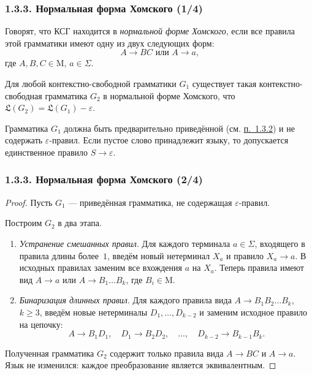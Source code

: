 \documentclass[mathserif,12pt,aspectratio=169]{beamer}
\renewcommand{\index}[1]{}
\def\odmkey#1#2{{\it\color{red} #1}\index{#2}}
\let\ge\geqslant
\def\DMref#1#2{{\color{blue}\underline{\hyperlink{#2}{#1}}}}
\begin{document}
\begin{frame}
  \frametitle{1.3.3. Нормальная форма Хомского (1/4)}

  Говорят, что КСГ находится в
  \odmkey{нормальной форме Хомского}{Нормальная форма!Хомского},
  если все правила этой грамматики имеют одну из двух следующих форм:
  \[
  A \to BC \text{ или } A \to a \text{,}
  \]
  где $A, B, C \in \mathrm{M}$, $a \in \Sigma$.

  \begin{theorem}
    Для любой контекстно-свободной грамматики $G_1$ существует такая
    контекст\-но-свободная грамматика $G_2$ в нормальной форме Хомского,
    что $\mathfrak{L}(G_2)=\mathfrak{L}(G_1)-\varepsilon$.
  \end{theorem}

  \medskip
  Грамматика $G_1$ должна быть предварительно
  приведённой (см. \DMref{п.~1.3.2}{1.3.2.}) и не содержать $\varepsilon$-правил.
  Если пустое слово принадлежит языку, то допускается единственное правило
  $S\to\varepsilon$.

\end{frame}

\begin{frame}
  \frametitle{1.3.3. Нормальная форма Хомского (2/4)}

  \begin{proof}
    Пусть $G_1$ — приведённая грамматика, не содержащая $\varepsilon$-правил.
    
    Построим $G_2$ в два этапа.
    \begin{enumerate}
      \item \odmkey{Устранение смешанных правил}{Устранение!смешанных правил}.
        Для каждого терминала $a\in\Sigma$, входящего в правила длины более~$1$,
        введём новый нетерминал $X_a$ и правило $X_a\to a$.
        В исходных правилах заменим все вхождения $a$ на $X_a$.
        Теперь правила имеют вид $A\to a$ или $A\to B_1\ldots B_k$, где $B_i\in \mathrm{M}$.
      \item \odmkey{Бинаризация длинных правил}{Бинаризация!правил}.
        Для каждого правила вида $A\to B_1B_2\ldots B_k$, $k\ge 3$,
        введём новые нетерминалы $D_1,\ldots,D_{k-2}$ и заменим исходное
        правило на цепочку:
        \[
          A \to B_1 D_1,\quad D_1 \to B_2 D_2,\quad \dots,\quad
          D_{k-2} \to B_{k-1} B_k .
        \]
    \end{enumerate}
    Полученная грамматика $G_2$ содержит только правила вида $A\to BC$ и $A\to a$.
    Язык не изменился: каждое преобразование является эквивалентным.
  \end{proof}

\end{frame}
\end{document}
